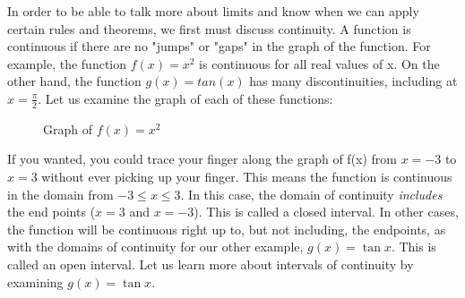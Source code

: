 In order to be able to talk more about limits and know when we can apply certain 
rules and theorems, we first must discuss continuity. A function is continuous if 
there are no "jumps" or "gaps" in the graph of the function. For example, the 
function $f(x) = x^2$ is continuous for all real values of x. On the other hand, 
the function $g(x) = tan(x)$ has many discontinuities, including at $x=\frac{\pi}
{2}$. Let us examine the graph of each of these functions:


\begin{figure}[H]
\centering
{}
\caption{Graph of $f(x)=x^2$}
\end{figure}
If you wanted, you could trace your finger along the graph of f(x) from $x=-3$ to 
$x=3$ without ever picking up your finger. This means the function is continuous in 
the domain from $-3 \leq x \leq 3$. In this case, the domain of continuity 
\textit{includes} the end points ($x=3$ and $x=-3$). This is called a closed 
interval. In other cases, the function will be continuous right up to, but not 
including, the endpoints, as with the domains of continuity for our other example, 
$g(x) = \tan{x}$. This is called an open interval. Let us learn more about intervals 
of continuity by examining $g(x) = \tan{x}$.

